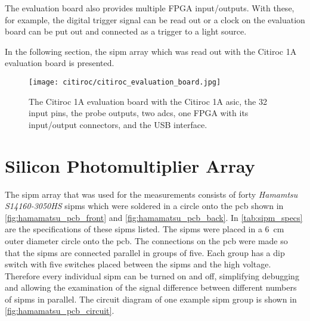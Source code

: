 The evaluation board also provides multiple FPGA input/outputs.
With these, for example, the digital trigger signal can be read out or a clock on the evaluation board can be put out and connected as a trigger to a light source.


In the following section, the \ac{sipm} array which was read out with the Citiroc 1A evaluation board is presented. 




\begin{figure}
    \centering
    \texttt{[image: citiroc/citiroc\_evaluation\_board.jpg]}
    \caption{The Citiroc 1A evaluation board with the Citiroc 1A \ac{asic}, the 32 input pins, the probe outputs, two \ac{adc}s, one FPGA with its input/output connectors, and the USB interface.}
    \label{fig:citiroc_evaluation_board}
\end{figure}










\section{Silicon Photomultiplier Array}
The \ac{sipm} array that was used for the measurements consists of forty \textit{Hamamtsu S14160-3050HS} \ac{sipm}s which were soldered in a circle onto the \ac{pcb} shown in \autoref{fig:hamamatsu_pcb_front} and \autoref{fig:hamamatsu_pcb_back}.
In \autoref{tab:sipm_specs} are the specifications of these \ac{sipm}s listed.
The \ac{sipm}s were placed in a \SI{6}{\centi\meter} outer diameter circle onto the \ac{pcb}.
The connections on the \ac{pcb} were made so that the \ac{sipm}s are connected parallel in groups of five.
Each group has a dip switch with five switches placed between the \ac{sipm}s and the high voltage.
Therefore every individual \ac{sipm} can be turned on and off, simplifying debugging and allowing the examination of the signal difference between different numbers of \ac{sipm}s in parallel.
The circuit diagram of one example \ac{sipm} group is shown in \autoref{fig:hamamatsu_pcb_circuit}. 

